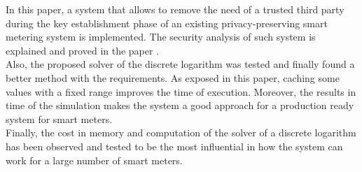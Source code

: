 
	In this paper, a system that allows to remove the need of a trusted
	third party during the key establishment phase of an existing privacy-preserving smart metering system is implemented. The security analysis of such system is explained and proved in the paper \cite{recsi}.\\

	Also, the proposed solver of the discrete logarithm was tested and finally
	found a better method with the requirements. As exposed in this paper, caching some values with a fixed range improves the time of execution.
	Moreover, the results in time of the simulation makes the system a good approach for a production ready system for smart meters.\\
	
	Finally, the cost in memory and computation of the solver of a discrete
	logarithm has been observed and tested to be the most influential in how
	the system can work for a large number of smart meters.
	
	
